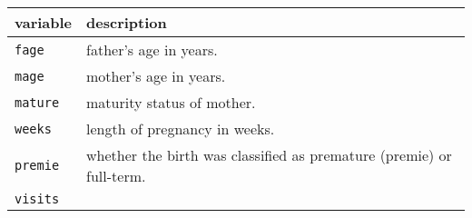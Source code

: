\documentclass[]{article}
\begin{document}
\begin{longtable}[]{@{}ll@{}}
\toprule
\begin{minipage}[b]{0.22\columnwidth}\raggedright\strut
variable\strut
\end{minipage} & \begin{minipage}[b]{0.60\columnwidth}\raggedright\strut
description\strut
\end{minipage}\tabularnewline
\midrule
\endhead
\begin{minipage}[t]{0.22\columnwidth}\raggedright\strut
\texttt{fage}\strut
\end{minipage} & \begin{minipage}[t]{0.60\columnwidth}\raggedright\strut
father's age in years.\strut
\end{minipage}\tabularnewline
\begin{minipage}[t]{0.22\columnwidth}\raggedright\strut
\texttt{mage}\strut
\end{minipage} & \begin{minipage}[t]{0.60\columnwidth}\raggedright\strut
mother's age in years.\strut
\end{minipage}\tabularnewline
\begin{minipage}[t]{0.22\columnwidth}\raggedright\strut
\texttt{mature}\strut
\end{minipage} & \begin{minipage}[t]{0.60\columnwidth}\raggedright\strut
maturity status of mother.\strut
\end{minipage}\tabularnewline
\begin{minipage}[t]{0.22\columnwidth}\raggedright\strut
\texttt{weeks}\strut
\end{minipage} & \begin{minipage}[t]{0.60\columnwidth}\raggedright\strut
length of pregnancy in weeks.\strut
\end{minipage}\tabularnewline
\begin{minipage}[t]{0.22\columnwidth}\raggedright\strut
\texttt{premie}\strut
\end{minipage} & \begin{minipage}[t]{0.60\columnwidth}\raggedright\strut
whether the birth was classified as premature (premie) or
full-term.\strut
\end{minipage}\tabularnewline
\begin{minipage}[t]{0.22\columnwidth}\raggedright\strut
\texttt{visits}\strut
\end{minipage} & \begin{minipage}[t]{0.60\columnwidth}\raggedright\strut

\end{minipage}
\end{longtable}
\end{document}
